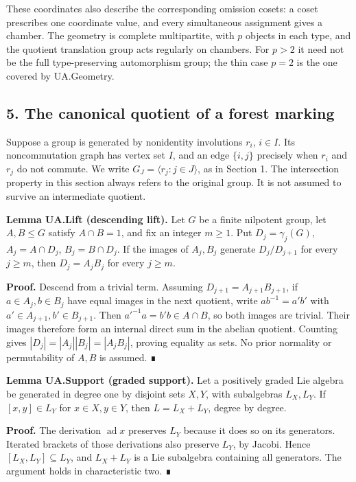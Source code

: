 \documentclass[
  11pt,
  a4paper,
]{article}
\begin{document}
These coordinates also describe the corresponding omission cosets: a
coset prescribes one coordinate value, and every simultaneous assignment
gives a chamber. The geometry is complete multipartite, with \(p\)
objects in each type, and the quotient translation group acts regularly
on chambers. For \(p>2\) it need not be the full type-preserving
automorphism group; the thin case \(p=2\) is the one covered by
UA.Geometry.

\subsection{5. The canonical quotient of a forest
marking}\label{the-canonical-quotient-of-a-forest-marking}

Suppose a group is generated by nonidentity involutions \(r_i\),
\(i\in I\). Its noncommutation graph has vertex set \(I\), and an edge
\(\{i,j\}\) precisely when \(r_i\) and \(r_j\) do not commute. We write
\(G_J=\langle r_j:j\in J\rangle\), as in Section 1. The intersection
property in this section always refers to the original group. It is not
assumed to survive an intermediate quotient.

\textbf{Lemma UA.Lift (descending lift).} Let \(G\) be a finite
nilpotent group, let \(A,B\le G\) satisfy \(A\cap B=1\), and fix an
integer \(m\ge1\). Put \(D_j=\gamma_j(G)\), \(A_j=A\cap D_j\),
\(B_j=B\cap D_j\). If the images of \(A_j,B_j\) generate \(D_j/D_{j+1}\)
for every \(j\ge m\), then \(D_j=A_jB_j\) for every \(j\ge m\).

\textbf{Proof.} Descend from a trivial term. Assuming
\(D_{j+1}=A_{j+1}B_{j+1}\), if \(a\in A_j,b\in B_j\) have equal images
in the next quotient, write \(ab^{-1}=a'b'\) with
\(a'\in A_{j+1},b'\in B_{j+1}\). Then \(a'^{-1}a=b'b\in A\cap B\), so
both images are trivial. Their images therefore form an internal direct
sum in the abelian quotient. Counting gives
\(|D_j|=|A_j||B_j|=|A_jB_j|\), proving equality as sets. No prior
normality or permutability of \(A,B\) is assumed. ∎

\textbf{Lemma UA.Support (graded support).} Let a positively graded Lie
algebra be generated in degree one by disjoint sets \(X,Y\), with
subalgebras \(L_X,L_Y\). If \([x,y]\in L_Y\) for \(x\in X,y\in Y\), then
\(L=L_X+L_Y\), degree by degree.

\textbf{Proof.} The derivation \(\operatorname{ad}x\) preserves \(L_Y\)
because it does so on its generators. Iterated brackets of those
derivations also preserve \(L_Y\), by Jacobi. Hence
\([L_X,L_Y]\subseteq L_Y\), and \(L_X+L_Y\) is a Lie subalgebra
containing all generators. The argument holds in characteristic two. ∎
\end{document}
